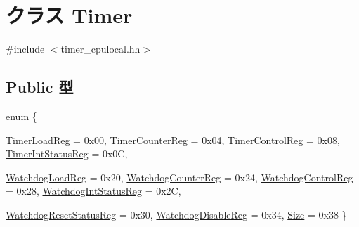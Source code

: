 \hypertarget{classCpuLocalTimer_1_1Timer}{
\section{クラス Timer}
\label{classCpuLocalTimer_1_1Timer}
}


{\ttfamily \#include $<$timer\_\-cpulocal.hh$>$}\subsection*{Public 型}
\begin{DoxyCompactItemize}
\item 
enum \{ \par
\hyperlink{classCpuLocalTimer_1_1Timer_a1fb9092bcdeada2d206bdc74afbbe122a6329979acc2f49e2090efa3349ad4881}{TimerLoadReg} =  0x00, 
\hyperlink{classCpuLocalTimer_1_1Timer_a1fb9092bcdeada2d206bdc74afbbe122a26222a8335f9b4227754aaacd2f9de44}{TimerCounterReg} =  0x04, 
\hyperlink{classCpuLocalTimer_1_1Timer_a1fb9092bcdeada2d206bdc74afbbe122a8a51f6f1feb5d1a1b7602ad2ffb850b9}{TimerControlReg} =  0x08, 
\hyperlink{classCpuLocalTimer_1_1Timer_a1fb9092bcdeada2d206bdc74afbbe122a06003210905c03a2c2459cf873c71b9f}{TimerIntStatusReg} =  0x0C, 
\par
\hyperlink{classCpuLocalTimer_1_1Timer_a1fb9092bcdeada2d206bdc74afbbe122ac1814e9dfd788d5640ca9506b03c85a0}{WatchdogLoadReg} =  0x20, 
\hyperlink{classCpuLocalTimer_1_1Timer_a1fb9092bcdeada2d206bdc74afbbe122a8af2a43f30e408306616e962221402a2}{WatchdogCounterReg} =  0x24, 
\hyperlink{classCpuLocalTimer_1_1Timer_a1fb9092bcdeada2d206bdc74afbbe122a73a6c5160af9be63e314823ae32b6855}{WatchdogControlReg} =  0x28, 
\hyperlink{classCpuLocalTimer_1_1Timer_a1fb9092bcdeada2d206bdc74afbbe122a325db532cd3eca9430deeb58fe2ab77b}{WatchdogIntStatusReg} =  0x2C, 
\par
\hyperlink{classCpuLocalTimer_1_1Timer_a1fb9092bcdeada2d206bdc74afbbe122ad477167210086367c39fd4a56aa2647a}{WatchdogResetStatusReg} =  0x30, 
\hyperlink{classCpuLocalTimer_1_1Timer_a1fb9092bcdeada2d206bdc74afbbe122a0ae0b381c018c42495f41553ff2451cc}{WatchdogDisableReg} =  0x34, 
\hyperlink{classCpuLocalTimer_1_1Timer_a1fb9092bcdeada2d206bdc74afbbe122aff9abf2b1a689f70a77a18da50c01d9f}{Size} =  0x38
 \}
\end{DoxyCompactItemize}
